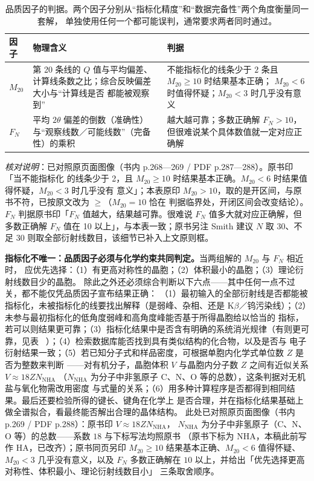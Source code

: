 \begin{table}[tbp]
  \centering
  \caption{品质因子的判据。两个因子分别从“指标化精度”和“数据完备性”两个角度衡量同一套解，
    单独使用任何一个都可能误判，通常要求两者同时通过。}
  \label{tab:ch04b-FOM}
  \begin{tabular}{@{}p{16mm}p{62mm}p{46mm}@{}}
    \toprule
    因子 & 物理含义 & 判据 \\
    \midrule
    $M_{20}$ & 第 20 条线的 $Q$ 值与平均偏差、计算线条数之比；综合反映偏差大小与“计算线是否
    都能被观察到” & 不能指标化的线条少于 $2$ 条且 $M_{20}\ge 10$ 时结果基本正确；
    $M_{20}<6$ 时值得怀疑；$M_{20}<3$ 时几乎没有意义 \\
    $F_{N}$ & 平均 $2\theta$ 偏差的倒数（准确性）与“观察线数／可能线数”（完备性）的乘积 &
    越大越可靠；多数正确解 $F_{N}>10$，但很难说某个具体数值就一定对应正确解 \\
    \bottomrule
  \end{tabular}
\end{table}
\emph{核对说明}：已对照原页面图像（书内 p.268—269 / PDF p.287—288）。原书印「当不能指标化
的线条少于 2，且 $M_{20}\ge 10$ 时结果基本正确。$M_{20}<6$ 时结果值得怀疑，$M_{20}<3$ 时几乎没有
意义」；本表原印 $M_{20}>10$，取的是开区间，与原书不符，已按原文改为 $\ge$（$M_{20}=10$ 恰在
判据临界处，开闭区间会改变结论）。$F_{N}$ 判据原书印「$F_{N}$ 值越大，结果越可靠。很难说
$F_{N}$ 值多大就对应正确解，但多数正确解 $F_{N}$ 值在 10 以上」，与本表一致；原书另注 Smith
建议 $N$ 取 30、不足 30 则取全部衍射线数目，该细节已补入上文原则框。

\begin{pitfall}
\textbf{指标化不唯一：品质因子必须与化学约束共同判定。}当两组解的 $M_{20}$ 与 $F_{N}$ 相近时，
应优先选择：（1）有更高对称性的晶胞；（2）体积最小的晶胞；（3）理论衍射线数目少的晶胞。
除此之外还必须综合判断以下六点——其中任何一点不过关，都不能仅凭品质因子宣布结果正确：
（1）最初输入的全部衍射线是否都能被指标化，未被指标化的线要找出解释（是弱峰、杂相、还是
K$\beta$／钨污染线）；（2）未参与最初指标化的低角度弱峰和高角度峰能否基于所得晶胞给以恰当的
指标，若可以则结果更可靠；（3）指标化结果中是否含有明确的系统消光规律（有则更可靠，见表
~）；（4）检索数据库能否找到具有类似结构的化合物，以及是否与
电子衍射结果一致；（5）若已知分子式和样品密度，可根据单胞内化学式单位数 $Z$ 是否为整数来判断
——对有机分子，晶胞体积 $V$ 与晶胞内分子数 $Z$ 之间有近似关系 $V\approx18Z N_{\mathrm{NHA}}$
（$N_{\mathrm{NHA}}$ 为分子中非氢原子 C、N、O 等的总数），这条判据对无机盐与氧化物需改用密度
与式量的关系；（6）用多种计算程序是否都得到相同结果。最后还要检验所得的键长、键角在化学上
是否合理，并在指标化结果基础上做全谱拟合，看最终能否解出合理的晶体结构。
此处已对照原页面图像（书内 p.269 / PDF p.288）：原书印 $V\approx18ZN_{\mathrm{NHA}}$，
$N_{\mathrm{NHA}}$ 为分子中非氢原子（C、N、O 等）的总数——系数 $18$ 与下标写法均照原书
（原书下标为 $\mathrm{NHA}$，本稿此前写作 $\mathrm{HA}$，已改齐）；原书同页另印
$M_{20}\ge10$ 结果基本正确、$M_{20}<6$ 值得怀疑、$M_{20}<3$ 几乎没有意义，以及
$F_{N}$ 多数正确解在 $10$ 以上，并给出「优先选择更高对称性、体积最小、理论衍射线数目小」
三条取舍顺序。
\end{pitfall}

